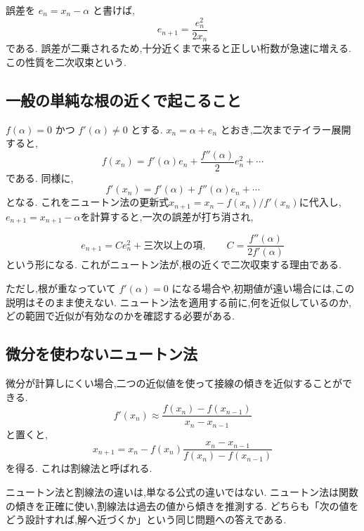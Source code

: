 誤差を $e_n=x_n-\alpha$ と書けば,
\[
  e_{n+1}=\frac{e_n^2}{2x_n}
\]
である.
誤差が二乗されるため,十分近くまで来ると正しい桁数が急速に増える.
この性質を二次収束という.

\subsection{一般の単純な根の近くで起こること}

$f(\alpha)=0$ かつ $f'(\alpha)\neq0$ とする.
$x_n=\alpha+e_n$ とおき,二次までテイラー展開すると,
\[
  f(x_n)=f'(\alpha)e_n+\frac{f''(\alpha)}2e_n^2+\cdots
\]
である.
同様に,
\[
  f'(x_n)=f'(\alpha)+f''(\alpha)e_n+\cdots
\]
となる.
これをニュートン法の更新式$x_{n+1}=x_n-f(x_n)/f'(x_n)$に代入し,\,$e_{n+1}=x_{n+1}-\alpha$を計算すると,一次の誤差が打ち消され,

\[
  e_{n+1}=C e_n^2+\text{三次以上の項},
  \qquad
  C=\frac{f''(\alpha)}{2f'(\alpha)}
\]
という形になる.
これがニュートン法が,根の近くで二次収束する理由である.

ただし,根が重なっていて $f'(\alpha)=0$ になる場合や,初期値が遠い場合には,この説明はそのまま使えない.
ニュートン法を適用する前に,何を近似しているのか,どの範囲で近似が有効なのかを確認する必要がある.

\subsection{微分を使わないニュートン法}

微分が計算しにくい場合,二つの近似値を使って接線の傾きを近似することができる.
\[
  f'(x_n)\approx
  \frac{f(x_n)-f(x_{n-1})}{x_n-x_{n-1}}
\]
と置くと,
\[
  x_{n+1}
  =
  x_n
  -
  f(x_n)
  \frac{x_n-x_{n-1}}{f(x_n)-f(x_{n-1})}
\]
を得る.
これは割線法と呼ばれる.

ニュートン法と割線法の違いは,単なる公式の違いではない.
ニュートン法は関数の傾きを正確に使い,割線法は過去の値から傾きを推測する.
どちらも「次の値をどう設計すれば,解へ近づくか」という同じ問題への答えである.
